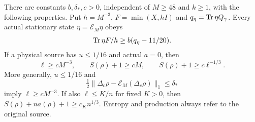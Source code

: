 \begin{corollary}
\label{cor:houghton-stationary}
There are constants $b,\delta_*,c>0$, independent of $M\geq48$ and
$k\geq1$, with the following properties. Put $h=M^{-3}$,
$F=\min(X,hI)$ and $q_\eta=\operatorname{Tr}\eta Q_\gamma$.
Every actual stationary state $\eta=\mathcal E_M\eta$ obeys
\begin{equation}\label{eq:stationary-capped-charge}
 \operatorname{Tr}\eta F/h\geq b(q_\eta-11/20).
\end{equation}
If a physical source has $u\leq1/16$ and actual $a=0$, then
\[
 \ell\geq cM^{-3},\qquad S(\rho)+1\geq cM,
 \qquad S(\rho)+1\geq c\ell^{-1/3}.
\]
More generally, $u\leq1/16$ and
\[
 \tfrac12\|\Delta_c\rho-\mathcal E_M(\Delta_c\rho)\|_1
       \leq\delta_*
\]
imply $\ell\geq cM^{-3}$. If also $\ell\leq K/n$ for fixed
$K>0$, then $S(\rho)+na(\rho)+1\geq c_Kn^{1/3}$.
Entropy and production always refer to the original source.
\end{corollary}


